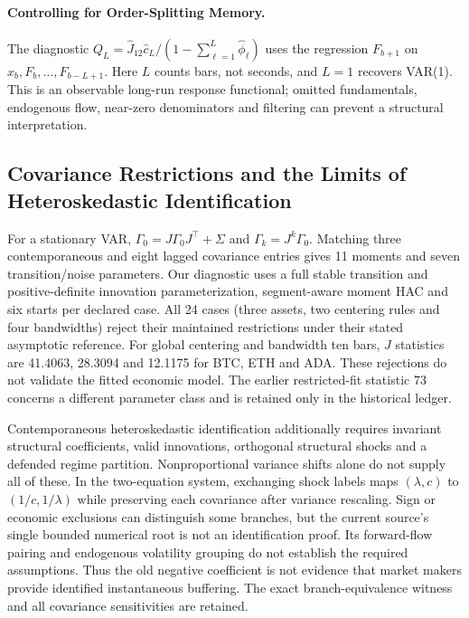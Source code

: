 \paragraph{Controlling for Order-Splitting Memory.}
The diagnostic $Q_L=\hat J_{12}\hat c_L/(1-\sum_{\ell=1}^L\hat\phi_\ell)$ uses the regression $F_{b+1}$ on $x_b,F_b,\ldots,F_{b-L+1}$. Here $L$ counts bars, not seconds, and $L=1$ recovers VAR(1). This is an observable long-run response functional; omitted fundamentals, endogenous flow, near-zero denominators and filtering can prevent a structural interpretation.

\subsection{Covariance Restrictions and the Limits of Heteroskedastic Identification}
For a stationary VAR, $\Gamma_0=J\Gamma_0J^\top+\Sigma$ and $\Gamma_k=J^k\Gamma_0$. Matching three contemporaneous and eight lagged covariance entries gives 11 moments and seven transition/noise parameters. Our diagnostic uses a full stable transition and positive-definite innovation parameterization, segment-aware moment HAC and six starts per declared case. All 24 cases (three assets, two centering rules and four bandwidths) reject their maintained restrictions under their stated asymptotic reference. For global centering and bandwidth ten bars, $J$ statistics are 41.4063, 28.3094 and 12.1175 for BTC, ETH and ADA. These rejections do not validate the fitted economic model. The earlier restricted-fit statistic 73 concerns a different parameter class and is retained only in the historical ledger.

Contemporaneous heteroskedastic identification additionally requires invariant structural coefficients, valid innovations, orthogonal structural shocks and a defended regime partition. Nonproportional variance shifts alone do not supply all of these. In the two-equation system, exchanging shock labels maps $(\lambda,c)$ to $(1/c,1/\lambda)$ while preserving each covariance after variance rescaling. Sign or economic exclusions can distinguish some branches, but the current source's single bounded numerical root is not an identification proof. Its forward-flow pairing and endogenous volatility grouping do not establish the required assumptions. Thus the old negative coefficient is not evidence that market makers provide identified instantaneous buffering. The exact branch-equivalence witness and all covariance sensitivities are retained.

